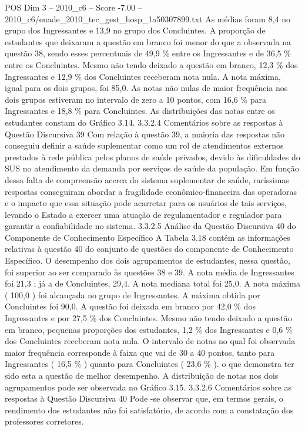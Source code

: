 \begin{textsample}{POS Dim 3 – 2010\_c6 – Score -7.00 – 2010\_c6/enade\_2010\_tec\_gest\_hosp\_1a50307899.txt}
As médias foram 8,4 no grupo dos Ingressantes e 13,9 no grupo dos Concluintes.
A proporção de estudantes que deixaram a questão em branco foi menor do que a observada na questão 38, sendo esses percentuais de 49,9 \% entre os Ingressantes e de 36,5 \% entre os Concluintes.
Mesmo não tendo deixado a questão em branco, 12,3 \% dos Ingressantes e 12,9 \% dos Concluintes receberam nota nula.
A nota máxima, igual para os dois grupos, foi 85,0.
As notas não nulas de maior frequência nos dois grupos estiveram no intervalo de zero a 10 pontos, com 16,6 \% para Ingressantes e 18,8 \% para Concluintes.
As distribuições das notas entre os estudantes constam do Gráfico 3.14. 3.3.2.4 Comentários sobre as respostas à Questão Discursiva 39 Com relação à questão 39, a maioria das respostas não conseguiu definir a saúde suplementar como um rol de atendimentos externos prestados à rede pública pelos planos de saúde privados, devido às dificuldades do SUS no atendimento da demanda por serviços de saúde da população.
Em função dessa falta de compreensão acerca do sistema suplementar de saúde, raríssimas respostas conseguiram abordar a fragilidade econômico-financeira das operadoras e o impacto que essa situação pode acarretar para os usuários de tais serviços, levando o Estado a exercer uma atuação de regulamentador e regulador para garantir a confiabilidade no sistema. 3.3.2.5 Análise da Questão Discursiva 40 do Componente de Conhecimento Específico A Tabela 3.18 contém as informações relativas à questão 40 do conjunto de questões do componente de Conhecimento Específico.
O desempenho dos dois agrupamentos de estudantes, nessa questão, foi superior ao ser comparado às questões 38 e 39.
A nota média de Ingressantes foi 21,3 ; já a de Concluintes, 29,4.
A nota mediana total foi 25,0.
A nota máxima ( 100,0 ) foi alcançada no grupo de Ingressantes.
A máxima obtida por Concluintes foi 90,0.
A questão foi deixada em branco por 42,0 \% dos Ingressantes e por 27,5 \% dos Concluintes.
Mesmo não tendo deixado a questão em branco, pequenas proporções dos estudantes, 1,2 \% dos Ingressantes e 0,6 \% dos Concluintes receberam nota nula.
O intervalo de notas no qual foi observada maior frequência corresponde à faixa que vai de 30 a 40 pontos, tanto para Ingressantes ( 16,5 \% ) quanto para Concluintes ( 23,6 \% ). o que demonstra ter sido esta a questão de melhor desempenho.
A distribuição de notas nos dois agrupamentos pode ser observada no Gráfico 3.15. 3.3.2.6 Comentários sobre as respostas à Questão Discursiva 40 Pode -se observar que, em termos gerais, o rendimento dos estudantes não foi satisfatório, de acordo com a constatação dos professores corretores.

\end{textsample}
